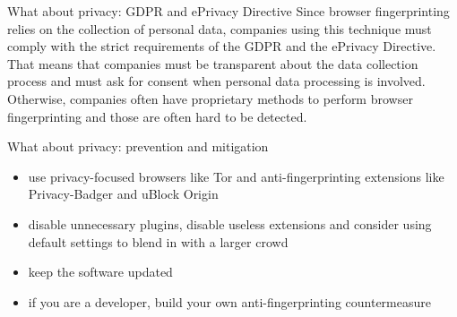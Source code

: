 \begin{frame}{What about privacy: GDPR and ePrivacy Directive}
  Since browser fingerprinting relies on the collection of personal data, companies using this technique must comply with the strict requirements of the GDPR and the ePrivacy Directive.
  That means that companies must be transparent about the data collection process and must ask for consent when personal data processing is involved.
  Otherwise, companies often have proprietary methods to perform browser fingerprinting and those are often hard to be detected.
\end{frame}

\begin{frame}{What about privacy: prevention and mitigation}
  \begin{itemize}
    \item use privacy-focused browsers like Tor and anti-fingerprinting extensions like Privacy-Badger and uBlock Origin
    \item disable unnecessary plugins, disable useless extensions and consider using default settings to blend in with a larger crowd
    \item keep the software updated
    \item if you are a developer, build your own anti-fingerprinting countermeasure
  \end{itemize}
\end{frame}